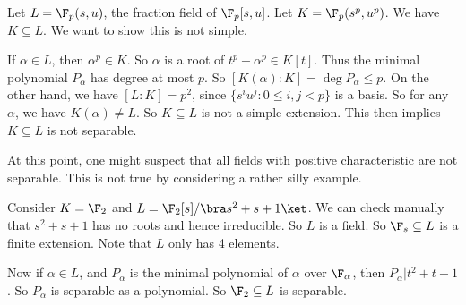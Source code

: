 \documentclass[a4paper]{article}
\begin{document}
\begin{eg}
  Let $L = \F_p(s, u)$, the fraction field of $\F_p[s, u]$. Let $K = \F_p(s^p, u^p)$. We have $K\subseteq L$. We want to show this is not simple.

  If $\alpha \in L$, then $\alpha^p \in K$. So $\alpha$ is a root of $t^p - \alpha^p \in K[t]$. Thus the minimal polynomial $P_\alpha$ has degree at most $p$. So $[K(\alpha): K] = \deg P_\alpha \leq p$. On the other hand, we have $[L:K] = p^2$, since $\{s^iu^j: 0 \leq i, j < p\}$ is a basis. So for any $\alpha$, we have $K(\alpha) \not= L$. So $K\subseteq L$ is not a simple extension. This then implies $K\subseteq L$ is not separable.
\end{eg}
At this point, one might suspect that all fields with positive characteristic are not separable. This is not true by considering a rather silly example.
\begin{eg}
  Consider $K = \F_2$ and $L = \F_2[s]/\bra s^2 + s + 1\ket$. We can check manually that $s^2 + s + 1$ has no roots and hence irreducible. So $L$ is a field. So $\F_s \subseteq L$ is a finite extension. Note that $L$ only has 4 elements.

  Now if $\alpha \in L$, and $P_\alpha$ is the minimal polynomial of $\alpha$ over $\F_\alpha$, then $P_\alpha| t^2 + t + 1$. So $P_\alpha$ is separable as a polynomial. So $\F_2 \subseteq L$ is separable.
\end{eg}
\end{document}
